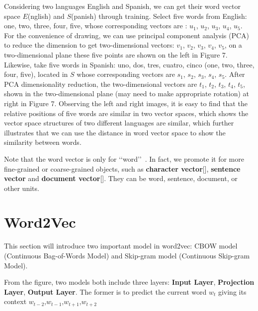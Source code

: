 Considering two languages English and Spanish, we can get their word vector space $E$(nglish) and $S$(panish) through training. Select five words from English: one, two, three, four, five, whose corresponding vectors are : $u_1$, $u_2$, $u_3$, $u_4$, $u_5$. For the convenience of drawing, we can use principal component analysis (PCA) to reduce the dimension to get two-dimensional vectors: $v_1$, $v_2$, $v_3$, $v_4$, $v_5$, on a two-dimensional plane these five points are shown on the left in Figure 7. Likewise, take five words in Spanish: uno, dos, tres, cuatro, cinco (one, two, three, four, five), located in $S$ whose corresponding vectors are $s_1$, $s_2$, $s_3$, $s_4$, $s_5$. After PCA dimensionality reduction, the two-dimensional vectors are $t_1$, $t_2$, $t_3$, $t_4$, $t_5$, shown in the two-dimensional plane (may need to make appropriate rotation) at right in Figure 7. Observing the left and right images, it is easy to find that the relative positions of five words are similar in two vector spaces, which shows the vector space structures of two different languages are similar, which further illustrates that we can use the distance in word vector space to show the similarity between words.

Note that the word vector is only for \lq\lq word\rq\rq\ . In fact, we promote it for more fine-grained or coarse-grained objects, such as \textbf{character vector}[], \textbf{sentence vector} and \textbf{document vector}[]. They can be word, sentence, document, or other units.

\section{Word2Vec}
This section will introduce two important model in word2vec: CBOW model (Continuous Bag-of-Words Model) and Skip-gram model (Continuous Skip-gram Model). 

From the figure, two models both include three layers: \textbf{Input Layer}, \textbf{Projection Layer}, \textbf{Output Layer}. The former is to predict the current word $w_t$ giving its context $w_{t-2}$,$w_{t-1}$,$w_{t+1}$,$w_{t+2}$

